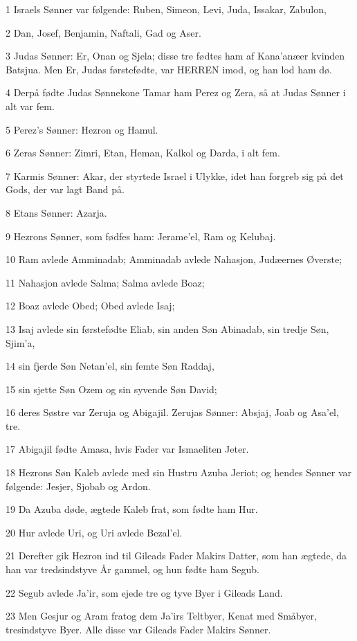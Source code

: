 \par 1 Israels Sønner var følgende: Ruben, Simeon, Levi, Juda, Issakar, Zabulon,
\par 2 Dan, Josef, Benjamin, Naftali, Gad og Aser.
\par 3 Judas Sønner: Er, Onan og Sjela; disse tre fødtes ham af Kana'anæer kvinden Batsjua. Men Er, Judas førstefødte, var HERREN imod, og han lod ham dø.
\par 4 Derpå fødte Judas Sønnekone Tamar ham Perez og Zera, så at Judas Sønner i alt var fem.
\par 5 Perez's Sønner: Hezron og Hamul.
\par 6 Zeras Sønner: Zimri, Etan, Heman, Kalkol og Darda, i alt fem.
\par 7 Karmis Sønner: Akar, der styrtede Israel i Ulykke, idet han forgreb sig på det Gods, der var lagt Band på.
\par 8 Etans Sønner: Azarja.
\par 9 Hezrons Sønner, som fødfes ham: Jerame'el, Ram og Kelubaj.
\par 10 Ram avlede Amminadab; Amminadab avlede Nahasjon, Judæernes Øverste;
\par 11 Nahasjon avlede Salma; Salma avlede Boaz;
\par 12 Boaz avlede Obed; Obed avlede Isaj;
\par 13 Isaj avlede sin førstefødte Eliab, sin anden Søn Abinadab, sin tredje Søn, Sjim'a,
\par 14 sin fjerde Søn Netan'el, sin femte Søn Raddaj,
\par 15 sin sjette Søn Ozem og sin syvende Søn David;
\par 16 deres Søstre var Zeruja og Abigajil. Zerujas Sønner: Absjaj, Joab og Asa'el, tre.
\par 17 Abigajil fødte Amasa, hvis Fader var Ismaeliten Jeter.
\par 18 Hezrons Søn Kaleb avlede med sin Hustru Azuba Jeriot; og hendes Sønner var følgende: Jesjer, Sjobab og Ardon.
\par 19 Da Azuba døde, ægtede Kaleb frat, som fødte ham Hur.
\par 20 Hur avlede Uri, og Uri avlede Bezal'el.
\par 21 Derefter gik Hezron ind til Gileads Fader Makirs Datter, som han ægtede, da han var tredsindstyve År gammel, og hun fødte ham Segub.
\par 22 Segub avlede Ja'ir, som ejede tre og tyve Byer i Gileads Land.
\par 23 Men Gesjur og Aram fratog dem Ja'irs Teltbyer, Kenat med Småbyer, tresindstyve Byer. Alle disse var Gileads Fader Makirs Sønner.
